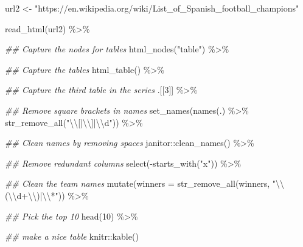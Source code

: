 \documentclass[]{tufte-handout}
\newenvironment{Shaded}{}{}
\newcommand{\AttributeTok}[1]{\textcolor[rgb]{0.49,0.56,0.16}{#1}}
\newcommand{\DecValTok}[1]{\textcolor[rgb]{0.25,0.63,0.44}{#1}}
\newcommand{\DocumentationTok}[1]{\textcolor[rgb]{0.73,0.13,0.13}{\textit{#1}}}
\newcommand{\FunctionTok}[1]{\textcolor[rgb]{0.02,0.16,0.49}{#1}}
\newcommand{\NormalTok}[1]{#1}
\newcommand{\OtherTok}[1]{\textcolor[rgb]{0.00,0.44,0.13}{#1}}
\newcommand{\SpecialCharTok}[1]{\textcolor[rgb]{0.25,0.44,0.63}{#1}}
\newcommand{\StringTok}[1]{\textcolor[rgb]{0.25,0.44,0.63}{#1}}
\begin{document}
\begin{Shaded}
\begin{Highlighting}[]
\NormalTok{url2 }\OtherTok{\textless{}{-}} \StringTok{"https://en.wikipedia.org/wiki/List\_of\_Spanish\_football\_champions"}

\FunctionTok{read\_html}\NormalTok{(url2) }\SpecialCharTok{\%\textgreater{}\%} 
        
        \DocumentationTok{\#\# Capture the nodes for tables}
        \FunctionTok{html\_nodes}\NormalTok{(}\StringTok{"table"}\NormalTok{) }\SpecialCharTok{\%\textgreater{}\%} 
        
        \DocumentationTok{\#\# Capture the tables}
        \FunctionTok{html\_table}\NormalTok{() }\SpecialCharTok{\%\textgreater{}\%} 
        
        \DocumentationTok{\#\# Capture the third table in the series}
\NormalTok{        .[[}\DecValTok{3}\NormalTok{]] }\SpecialCharTok{\%\textgreater{}\%} 
        
        \DocumentationTok{\#\# Remove square brackets in names}
        \FunctionTok{set\_names}\NormalTok{(}\FunctionTok{names}\NormalTok{(.) }\SpecialCharTok{\%\textgreater{}\%} \FunctionTok{str\_remove\_all}\NormalTok{(}\StringTok{"}\SpecialCharTok{\textbackslash{}\textbackslash{}}\StringTok{[|}\SpecialCharTok{\textbackslash{}\textbackslash{}}\StringTok{]|}\SpecialCharTok{\textbackslash{}\textbackslash{}}\StringTok{d"}\NormalTok{)) }\SpecialCharTok{\%\textgreater{}\%} 
        
        \DocumentationTok{\#\# Clean names by removing spaces}
\NormalTok{        janitor}\SpecialCharTok{::}\FunctionTok{clean\_names}\NormalTok{() }\SpecialCharTok{\%\textgreater{}\%}
        
        \DocumentationTok{\#\# Remove redundant columns}
        \FunctionTok{select}\NormalTok{(}\SpecialCharTok{{-}}\FunctionTok{starts\_with}\NormalTok{(}\StringTok{"x"}\NormalTok{)) }\SpecialCharTok{\%\textgreater{}\%} 
        
        \DocumentationTok{\#\# Clean the team names}
        \FunctionTok{mutate}\NormalTok{(}\AttributeTok{winners =} \FunctionTok{str\_remove\_all}\NormalTok{(winners, }\StringTok{"}\SpecialCharTok{\textbackslash{}\textbackslash{}}\StringTok{(}\SpecialCharTok{\textbackslash{}\textbackslash{}}\StringTok{d+}\SpecialCharTok{\textbackslash{}\textbackslash{}}\StringTok{)|}\SpecialCharTok{\textbackslash{}\textbackslash{}}\StringTok{*"}\NormalTok{)) }\SpecialCharTok{\%\textgreater{}\%} 
        
        \DocumentationTok{\#\# Pick the top 10}
        \FunctionTok{head}\NormalTok{(}\DecValTok{10}\NormalTok{) }\SpecialCharTok{\%\textgreater{}\%} 
        
        \DocumentationTok{\#\# make a nice table}
\NormalTok{        knitr}\SpecialCharTok{::}\FunctionTok{kable}\NormalTok{()}
\end{Highlighting}
\end{Shaded}
\end{document}
